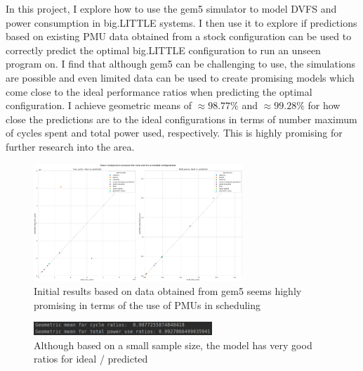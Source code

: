 In this project, I explore how to use the gem5 simulator to model DVFS and 
power consumption in big.LITTLE systems. I then use it to explore if 
predictions based on existing PMU data obtained from a stock configuration can 
be used to correctly predict the optimal big.LITTLE configuration to run an 
unseen program on. I find that although gem5 can be challenging to use, the 
simulations are possible and even limited data can be used to create promising 
models which come close to the ideal performance ratios when predicting the 
optimal configuration. I achieve geometric means of $\approx 98.77\%$ and 
$\approx 99.28\%$ for how close the predictions are to the ideal configurations 
in terms of number maximum of cycles spent and total power used, respectively. 
This is highly promising for further research into the area.
\begin{figure}[H]
    \centering
    \includegraphics[width=0.7\textwidth]{result-plots/stock-2b2L/system-scatter.png}
    \caption{Initial results based on data obtained from gem5 seems highly
             promising in terms of the use of PMUs in scheduling}
\end{figure}
\begin{figure}[H]
    \centering
    \includegraphics[width=0.6\textwidth]{screenshots/promising-geomeans.png}
    \caption{Although based on a small sample size, the model has very good
             ratios for ideal / predicted}
\end{figure}
